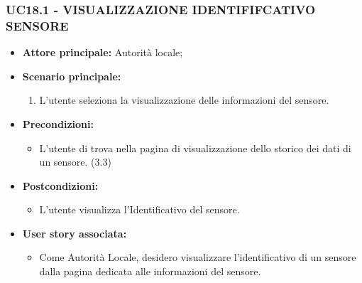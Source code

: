 \subsubsection{UC18.1 - VISUALIZZAZIONE IDENTIFIFCATIVO SENSORE}
\begin{itemize}
    \item \textbf{Attore principale:} Autorità locale;
    \item \textbf{Scenario principale:}
    \begin{enumerate}
        \item L'utente seleziona la visualizzazione delle informazioni del sensore.
    \end{enumerate}
\item \textbf{Precondizioni:}
    \begin{itemize}
        \item  L'utente di trova nella pagina di visualizzazione dello storico dei dati di un sensore. (3.3)
    \end{itemize}
    \item \textbf{Postcondizioni:}
          \begin{itemize}
              \item  L'utente visualizza l'Identificativo del sensore.
          \end{itemize}\item \textbf{User story associata:}
          \begin{itemize}
              \item Come Autorità Locale, desidero visualizzare l'identificativo di un sensore dalla pagina dedicata alle informazioni del sensore.
          \end{itemize}
\end{itemize}
